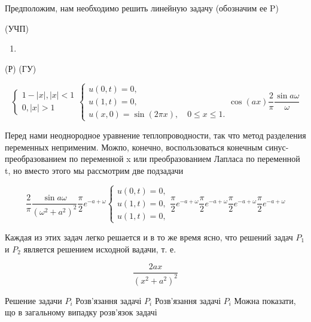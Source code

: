 \documentclass[
  ukrainian,
]{article}
\providecommand{\tightlist}{%
  \setlength{\itemsep}{0pt}\setlength{\parskip}{0pt}}
\begin{document}
Предположим, нам необходимо решить линейную задачу (обозначим ее P)

(УЧП)

\begin{enumerate}
\def\labelenumi{\arabic{enumi}.}
\setcounter{enumi}{17}
\tightlist
\item
\end{enumerate}

(Р) (ГУ)

\[
\begin{cases} 1-|x|, |x| < 1 \\ 0, |x| > 1 \end{cases}
\begin{cases} u(0, t) = 0, \\ u(1, t) = 0, \\ u(x, 0) = \sin(2\pi x), \quad 0 \le x \le 1. \end{cases}
\cos(ax)
\frac{2}{\pi} \frac{\sin a\omega}{\omega}
\]

Перед нами неоднородное уравнение теплопроводности, так что метод
разделения переменных неприменим. Можпо, конечно, воспользоваться
конечным синус-преобразованием по переменной x или преобразованием
Лапласа по переменной t, но вместо этого мы рассмотрим две подзадачи

\[
\frac{2}{\pi} \frac{\sin a\omega}{(\omega^2+a^2)^2}
\frac{\pi}{2} e^{-a+\omega}
\begin{cases} u(0, t) = 0, \\ u(1, t) = 0, \\ u(1, t) = 0, \end{cases}
\frac{\pi}{2} e^{-a+\omega}
\frac{\pi}{2} e^{-a+\omega}
\frac{\pi}{2} e^{-a+\omega}
\frac{\pi}{2} e^{-a+\omega}
\]

Каждая из этих задач легко решается и в то же время ясно, что
 решений задач \(P_1\) и \(P_2\) является решением исходной
вадачи, т. е.

\[
\frac{2ax}{(x^2+a^2)^2}
\]

Решение задачи \(P_{i}\) Розв'язання задачі \(P_i\) Розв'язання задачі
\(P_i\) Можна показати, що в загальному випадку розв'язок задачі
\end{document}
